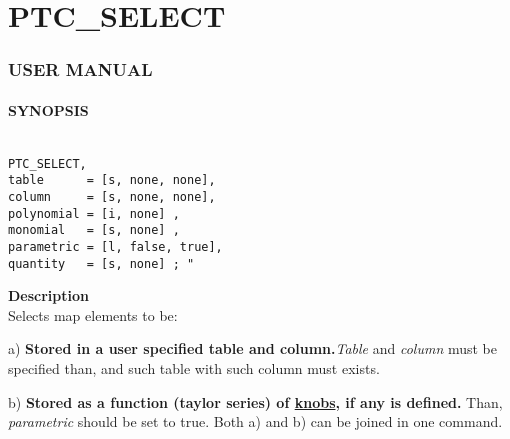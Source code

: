 


\section{PTC\_SELECT}





\subsubsection{   USER MANUAL   }


\paragraph{SYNOPSIS}
\begin{verbatim}

PTC_SELECT, 
table      = [s, none, none], 
column     = [s, none, none], 
polynomial = [i, none] , 
monomial   = [s, none] , 
parametric = [l, false, true], 
quantity   = [s, none] ; "

\end{verbatim}


\textbf{ Description }\\

 Selects map elements to be: 

    a) \textbf{Stored in a user specified table and column.}\textit{Table} and \textit{column} must be specified than,       and such table with such column must exists. 

    b) \textbf{Stored as a function (taylor series) of        \href{PTC_Knob.html}{knobs},  if any is defined.}        Than, \textit{parametric} should be set to true.   Both a) and b) can be joined in one command.   
\\ 

